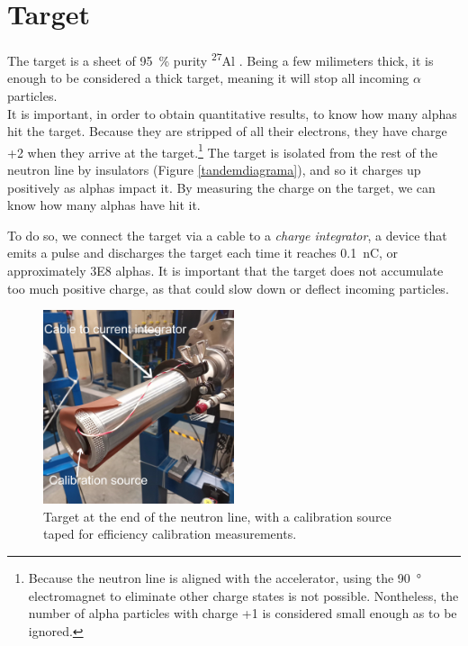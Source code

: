 \documentclass[a4paper,12pt]{report}
\newcommand{\an}{($\alpha$,n) }
\newcommand{\Aliso}{\textsuperscript{27}Al }
\begin{document}
\section{Target}
The target is a sheet of \qty{95}{\percent} purity \Aliso.
Being a few milimeters thick, it is enough to be considered a thick target, meaning it will stop all incoming $\alpha$ particles.
\\


It is important, in order to obtain quantitative results, to know how many alphas hit the target.
Because they are stripped of all their electrons, they have charge +2 when they arrive at the target.\footnote{Because the neutron line is aligned with the accelerator, using the \qty{90}{\degree} electromagnet to eliminate other charge states is not possible. Nontheless, the number of alpha particles with charge +1 is considered small enough as to be ignored.}
The target is isolated from the rest of the neutron line by insulators (Figure \ref{tandemdiagrama}), and so it charges up positively as alphas impact it.
By measuring the charge on the target, we can know how many alphas have hit it.

To do so, we connect the target via a cable to a \emph{charge integrator}, a device that emits a pulse and discharges the target each time it reaches \qty{0.1}{\nano\coulomb}, or approximately \num{3E8} alphas.
It is important that the target does not accumulate too much positive charge, as that could slow down or deflect incoming particles.

\begin{figure}[H]
	\centering
	\includegraphics[width=0.5\textwidth]{target_with_calibration.jpg}
	\caption{Target at the end of the neutron line, with a calibration source taped for efficiency calibration measurements.}
	\label{target_photo}
\end{figure}
\end{document}
